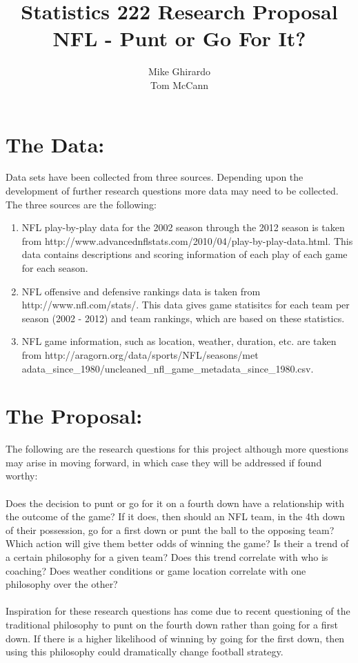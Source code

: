 \documentclass{article}
\begin{document}
\pagestyle{fancy}
\title{\bf Statistics 222 Research Proposal\\NFL - Punt or Go For It?}
\author{ Mike Ghirardo\\ Tom McCann}
\maketitle
\section*{The Data: }

Data sets have been collected from three sources.  Depending upon the development of further research questions more data may need to be collected. The three sources are the following:
\begin{enumerate}
\item
NFL play-by-play data for the 2002 season through the 2012 season is taken from http://www.advancednflstats.com/2010/04/play-by-play-data.html. This data contains descriptions and scoring information of each play of each game for each season.
\item
NFL offensive and defensive rankings data is taken from http://www.nfl.com/stats/. This data gives game statisitcs for each team per season (2002 - 2012) and team rankings, which are based on these statistics. 
\item
NFL game information, such as location, weather, duration, etc. are taken from http://aragorn.org/data/sports/NFL/seasons/met
adata\_since\_1980/uncleaned\_nfl\_game\_metadata\_since\_1980.csv.
\end{enumerate}
\section*{The Proposal: }
The following are the research questions for this project although more questions may arise in moving forward, in which case they will be addressed if found worthy:\\
\smallskip\\
Does the decision to punt or go for it on a fourth down have a relationship with the outcome of the game? If it does, then should an NFL team, in the 4th down of their possession, go for a first down or punt the ball to the opposing team? Which action will give them better odds of winning the game? Is their a trend of a certain philosophy  for a given team? Does this trend correlate with who is coaching? Does weather conditions or game location correlate with one philosophy over the other?\\
\smallskip\\
Inspiration for these research questions has come due to recent questioning of the traditional philosophy to punt on the fourth down rather than going for a first down. If there is a higher likelihood of winning by going for the first down, then using this philosophy could dramatically change football strategy. 
\end{document}
